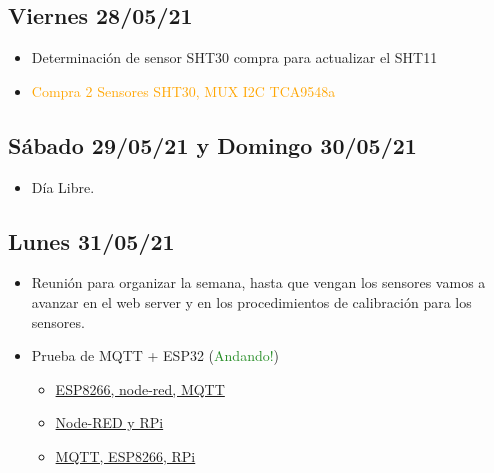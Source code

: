 \subsection*{Viernes 28/05/21}
\begin{itemize}
    \item Determinación de sensor SHT30 compra para actualizar el SHT11
    \item \textcolor{orange}{Compra 2 Sensores SHT30, MUX I2C TCA9548a}
\end{itemize}
\subsection*{Sábado 29/05/21 y Domingo 30/05/21}
    \begin{itemize}
        \item Día Libre.
    \end{itemize}

\subsection*{Lunes 31/05/21}
    \begin{itemize}
        \item Reunión para organizar la semana, hasta que vengan los sensores vamos a avanzar en el web server y en los procedimientos de calibración para los sensores.
        \item Prueba de MQTT + ESP32 (\textcolor{ForestGreen}{Andando!})
        \begin{itemize}
            \item \href{https://randomnerdtutorials.com/esp8266-and-node-red-with-mqtt/}{ESP8266, node-red, MQTT}
            \item \href{https://randomnerdtutorials.com/getting-started-with-node-red-on-raspberry-pi/}{Node-RED y RPi}
            \item \href{https://programarfacil.com/esp8266/mqtt-esp8266-raspberry-pi/}{MQTT, ESP8266, RPi}
        \end{itemize}
    \end{itemize}

\clearpage